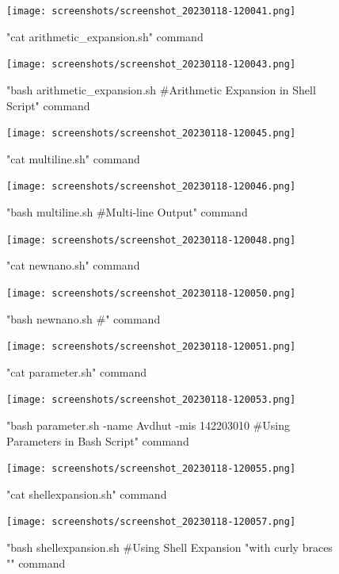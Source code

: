 \documentclass[b5paper]{article}
\begin{document}
\begin{figure} \centering \texttt{[image: screenshots/screenshot\_20230118-120041.png]} \caption{"cat arithmetic_expansion.sh" command} \end{figure}
\begin{figure} \centering \texttt{[image: screenshots/screenshot\_20230118-120043.png]} \caption{"bash arithmetic_expansion.sh #Arithmetic Expansion in Shell Script" command} \end{figure}
\begin{figure} \centering \texttt{[image: screenshots/screenshot\_20230118-120045.png]} \caption{"cat multiline.sh" command} \end{figure}
\begin{figure} \centering \texttt{[image: screenshots/screenshot\_20230118-120046.png]} \caption{"bash multiline.sh #Multi-line Output" command} \end{figure}
\begin{figure} \centering \texttt{[image: screenshots/screenshot\_20230118-120048.png]} \caption{"cat newnano.sh" command} \end{figure}
\begin{figure} \centering \texttt{[image: screenshots/screenshot\_20230118-120050.png]} \caption{"bash newnano.sh #" command} \end{figure}
\begin{figure} \centering \texttt{[image: screenshots/screenshot\_20230118-120051.png]} \caption{"cat parameter.sh" command} \end{figure}
\begin{figure} \centering \texttt{[image: screenshots/screenshot\_20230118-120053.png]} \caption{"bash parameter.sh -name Avdhut -mis 142203010 #Using Parameters in Bash Script" command} \end{figure}
\begin{figure} \centering \texttt{[image: screenshots/screenshot\_20230118-120055.png]} \caption{"cat shellexpansion.sh" command} \end{figure}
\begin{figure} \centering \texttt{[image: screenshots/screenshot\_20230118-120057.png]} \caption{"bash shellexpansion.sh #Using Shell Expansion "with curly braces {}"" command} \end{figure}	
\end{document}
